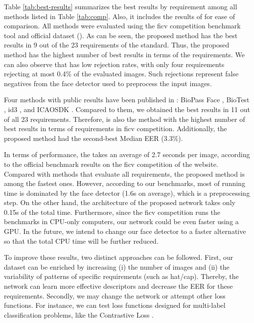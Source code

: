 Table \ref{tab:best-results} summarizes the best results by requirement among all methods listed in Table \ref{tab:comp}. Also, it includes the results of \methodname for ease of comparison. All methods were evaluated using the \acs{ficv} competition benchmark tool and official dataset (\ficvofficial). As can be seen, the proposed method has the best results in 9 out of the 23 requirements of the \icao standard. Thus, the proposed method has the highest number of best results in terms of the requirements. We can also observe that \methodname has low rejection rates, with only four requirements rejecting at most 0.4\% of the evaluated images. Such rejections represent false negatives from the face detector used to preprocess the input images.
 

 
Four methods with public results have been published in \fvcongoing: BioPass Face \citep{fvcVsoft}, BioTest \citep{fvcBioTest}, id3 \citep{fvcICAOCompliance}, and ICAOSDK \citep{fvcSeamfix}. Compared to them, we obtained the best results in 11 out of all 23 requirements. Therefore, \methodname is also the method with the highest number of best results in terms of requirements in \acs{ficv} competition. Additionally, the proposed method had the second-best Median EER (3.3\%).
 
In terms of performance, the \methodname takes an average of 2.7 seconds per image, according to the official benchmark results on the \acs{ficv} competition of the \fvcongoing website. Compared with methods that evaluate all requirements, the proposed method is among the fastest ones. However, according to our benchmarks, most of running time is dominated by the face detector (1.6s on average), which is a preprocessing step. On the other hand, the architecture of the proposed network takes only 0.15s of the total time. Furthermore, since the \acs{ficv} competition runs the benchmarks in CPU-only computers, our network could be even faster using a GPU. In the future, we intend to change our face detector to a faster alternative so that the total CPU time will be further reduced.
 
To improve these results, two distinct approaches can be followed. First, our dataset can be enriched by increasing (i) the number of images and (ii) the variability of patterns of specific requirements (such as hat/cap). Thereby, the network can learn more effective descriptors and decrease the EER for these requirements. Secondly, we may change the network or attempt other loss functions. For instance, we can test loss functions designed for multi-label classification problems, like the Contrastive Loss \citep{khosla2020supervised}.
 
